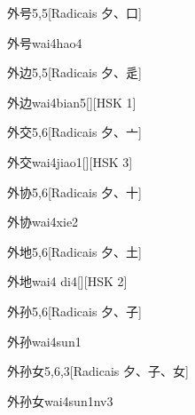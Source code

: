 \begin{entry}{外号}{5,5}[Radicais ⼣、⼝]
  \begin{phonetics}{外号}{wai4hao4}
  \end{phonetics}
\end{entry}

\begin{entry}{外边}{5,5}[Radicais ⼣、⾡]
  \begin{phonetics}{外边}{wai4bian5}[][HSK 1]
  \end{phonetics}
\end{entry}

\begin{entry}{外交}{5,6}[Radicais ⼣、⼇]
  \begin{phonetics}{外交}{wai4jiao1}[][HSK 3]
  \end{phonetics}
\end{entry}

\begin{entry}{外协}{5,6}[Radicais ⼣、⼗]
  \begin{phonetics}{外协}{wai4xie2}
  \end{phonetics}
\end{entry}

\begin{entry}{外地}{5,6}[Radicais ⼣、⼟]
  \begin{phonetics}{外地}{wai4 di4}[][HSK 2]
  \end{phonetics}
\end{entry}

\begin{entry}{外孙}{5,6}[Radicais ⼣、⼦]
  \begin{phonetics}{外孙}{wai4sun1}
  \end{phonetics}
\end{entry}

\begin{entry}{外孙女}{5,6,3}[Radicais ⼣、⼦、⼥]
  \begin{phonetics}{外孙女}{wai4sun1nv3}
  \end{phonetics}
\end{entry}

